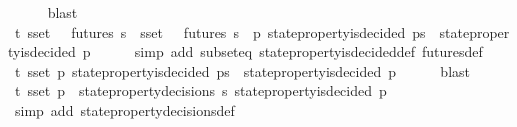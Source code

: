 \begin{isabellebody}
\ \ \ \ \isamarkupfalse%
\ blast\isanewline
\ \ \isamarkupfalse%
\ {\isachardoublequoteopen}{\isasymexists}{\isasymsigma}{\isasymin}{\isasymSigma}t{\isachardot}\ {\isacharparenleft}{\isasymforall}s{\isasymin}{\isasymsigma}{\isacharunderscore}set{\isachardot}\ {\isasymsigma}\ {\isasymin}\ futures\ s{\isacharparenright}\ {\isasymand}\ {\isacharparenleft}{\isasymforall}s{\isasymin}{\isasymsigma}{\isacharunderscore}set{\isachardot}\ {\isasymsigma}\ {\isasymin}\ futures\ s\ {\isasymlongrightarrow}\ {\isacharparenleft}{\isasymforall}p{\isachardot}\ state{\isacharunderscore}property{\isacharunderscore}is{\isacharunderscore}decided\ {\isacharparenleft}p{\isacharcomma}s{\isacharparenright}\ {\isasymlongrightarrow}\ state{\isacharunderscore}property{\isacharunderscore}is{\isacharunderscore}decided\ {\isacharparenleft}p{\isacharcomma}{\isasymsigma}{\isacharparenright}{\isacharparenright}{\isacharparenright}{\isachardoublequoteclose}\isanewline
\ \ \ \ \isamarkupfalse%
\ {\isacharparenleft}simp\ add{\isacharcolon}\ subset{\isacharunderscore}eq\ state{\isacharunderscore}property{\isacharunderscore}is{\isacharunderscore}decided{\isacharunderscore}def\ futures{\isacharunderscore}def{\isacharparenright}\isanewline
\ \ \isamarkupfalse%
\ {\isachardoublequoteopen}{\isasymexists}{\isasymsigma}{\isasymin}{\isasymSigma}t{\isachardot}\ {\isasymforall}s{\isasymin}{\isasymsigma}{\isacharunderscore}set{\isachardot}\ {\isacharparenleft}{\isasymforall}p{\isachardot}\ state{\isacharunderscore}property{\isacharunderscore}is{\isacharunderscore}decided\ {\isacharparenleft}p{\isacharcomma}s{\isacharparenright}\ {\isasymlongrightarrow}\ state{\isacharunderscore}property{\isacharunderscore}is{\isacharunderscore}decided\ {\isacharparenleft}p{\isacharcomma}{\isasymsigma}{\isacharparenright}{\isacharparenright}{\isachardoublequoteclose}\isanewline
\ \ \ \ \isamarkupfalse%
\ blast\isanewline
\ \ \isamarkupfalse%
\ {\isachardoublequoteopen}{\isasymexists}{\isasymsigma}{\isasymin}{\isasymSigma}t{\isachardot}\ {\isasymforall}s{\isasymin}{\isasymsigma}{\isacharunderscore}set{\isachardot}\ {\isacharparenleft}{\isasymforall}p\ {\isasymin}\ state{\isacharunderscore}property{\isacharunderscore}decisions\ s{\isachardot}\ state{\isacharunderscore}property{\isacharunderscore}is{\isacharunderscore}decided\ {\isacharparenleft}p{\isacharcomma}{\isasymsigma}{\isacharparenright}{\isacharparenright}{\isachardoublequoteclose}\isanewline
\ \ \ \ \isamarkupfalse%
\ {\isacharparenleft}simp\ add{\isacharcolon}\ state{\isacharunderscore}property{\isacharunderscore}decisions{\isacharunderscore}def{\isacharparenright}\isanewline

\end{isabellebody}
